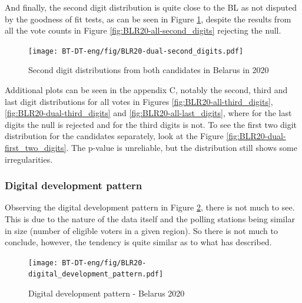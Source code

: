 And finally, the second digit distribution is quite close to the BL as not disputed by the goodness of fit tests, as can be seen in Figure \ref{fig:BLR20-dual-second_digits}, despite the results from all the vote counts in Figure \ref{fig:BLR20-all-second_digits} rejecting the null. 

\begin{figure}[h]
    \centering
    \caption{Second digit distributions from both candidates in Belarus in 2020}
    \texttt{[image: BT-DT-eng/fig/BLR20-dual-second\_digits.pdf]}
    \label{fig:BLR20-dual-second_digits}
\end{figure}

Additional plots can be seen in the appendix C, notably the second, third and last digit distributions for all votes in Figures \ref{fig:BLR20-all-third_digits},  \ref{fig:BLR20-dual-third_digits} and \ref{fig:BLR20-all-last_digits}, where for the last digits the null is rejected and for the third digits is not. To see the first two digit distribution for the candidates separately, look at the Figure \ref{fig:BLR20-dual-first_two_digits}. The p-value is unreliable, but the distribution still shows some irregularities. 


\subsubsection{Digital development pattern}

Observing the digital development pattern in Figure \ref{fig:BLR20-digital_development_pattern}, there is not much to see. This is due to the nature of the data itself and the polling stations being similar in size (number of eligible voters in a given region). So there is not much to conclude, however, the tendency is quite similar as to what \citeauthor{kossovsky2014benford} has described. 

\begin{figure}[h]
    \centering
    \caption{Digital development pattern - Belarus 2020}
    \texttt{[image: BT-DT-eng/fig/BLR20-digital\_development\_pattern.pdf]}
    \label{fig:BLR20-digital_development_pattern}
\end{figure}




